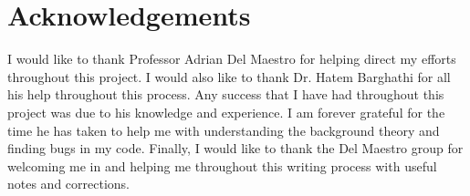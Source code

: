 \chapter*{Acknowledgements}
I would like to thank Professor Adrian Del Maestro for helping direct my efforts throughout this project. I would also like to thank Dr. Hatem Barghathi for all his help throughout this process. Any success that I have had throughout this project was due to his knowledge and experience. I am forever grateful for the time he has taken to help me with understanding the background theory and finding bugs in my code. Finally, I would like to thank the Del Maestro group for welcoming me in and helping me throughout this writing process with useful notes and corrections. 